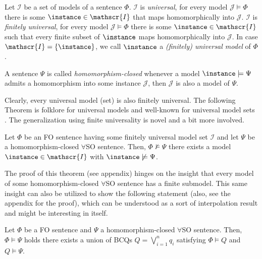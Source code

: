 \begin{definition}
Let $\mathscr{I}$ be a set of models of a sentence $\Phi$.
$\mathscr{I}$ is \emph{universal}, \iffi for every model $\mathcal{J} \models \Phi$ there is some $\instance \in \mathscr{I}$ that maps homomorphically into $\mathcal{J}$.
$\mathscr{I}$ is \emph{finitely universal}, \iffi for every model $\mathcal{J} \models \Phi$ there is some $\instance \in \mathscr{I}$ such that every finite subset of $\instance$ maps homomorphically into $\mathcal{J}$.  
%
In case $\mathscr{I} = \{\instance\}$, we call $\instance$ a \emph{(finitely) universal model} of $\Phi$.


A sentence $\Psi$ is called \emph{homomorphism-closed} \iffi whenever a model $\instance \models \Psi$ admits a homomorphism into some instance $\mathcal{J}$, then $\mathcal{J}$ is also a model of $\Psi$. 
\end{definition}
%
Clearly, every universal model (set) is also finitely universal.
The following Theorem is folklore for universal models and well-known for universal model sets \cite{BourhisMMP16}.
The generalization using finite universality is novel and a bit more involved.
%
\begin{theorem}\label{thm:universal}
Let $\Phi$ be an FO sentence having some finitely universal model set $\mathscr{I}$ and let $\Psi$ be a homomorphism-closed $\forall$SO sentence. Then, $\Phi \not \models \Psi$ \iffi there exists a model $\instance \in \mathscr{I}$ with $\instance \not\models \Psi$.
\end{theorem}
%
The proof of this theorem (see appendix) hinges on the insight that every model of some homomorphism-closed $\forall$SO sentence has a fi\-nite submodel.
This same insight can also be utilized to show the following statement (also, see the appendix for the proof), which can be understood as a sort of interpolation result and might be interesting in itself.
%
\begin{lemma}\label{lem:interpolation}
Let $\Phi$ be a FO sentence and $\Psi$ a homomorphism-closed $\forall$SO sentence.
Then, $\Phi \models \Psi$ holds \iffi there exists a union of BCQs $Q = \bigvee_{i=1}^n q_{i}$ satisfying $\Phi \models Q$ and $Q \models \Psi$.
\end{lemma}

